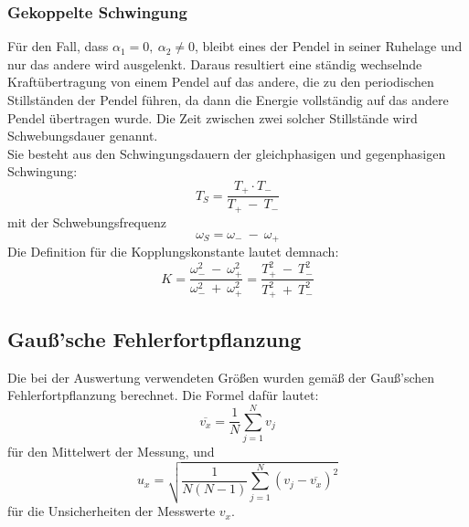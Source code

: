 \subsubsection{Gekoppelte Schwingung}
Für den Fall, dass $\alpha_1 = 0,\ \alpha_2 \neq 0$, bleibt eines der Pendel in seiner Ruhelage und nur das andere wird ausgelenkt.
Daraus resultiert eine ständig wechselnde Kraftübertragung von einem Pendel auf das andere, die zu den periodischen Stillständen der Pendel führen, da dann die Energie vollständig auf das andere Pendel übertragen wurde.
Die Zeit zwischen zwei solcher Stillstände wird Schwebungsdauer genannt.\\
Sie besteht aus den Schwingungsdauern der gleichphasigen und gegenphasigen Schwingung:
\begin{equation}
    T_S = \frac{T_+\cdot T_-}{T_+\ -\ T_-}
    \label{eq:Tpose}
\end{equation}
mit der Schwebungsfrequenz
\begin{equation}
    \omega_S = \omega_-\ -\ \omega_+
    \label{eq:lol3}
\end{equation}
Die Definition für die Kopplungskonstante lautet demnach:
\begin{equation}
    K = \frac{\omega_-^2\ -\ \omega_+^2}{\omega_-^2\ +\ \omega_+^2} = \frac{T_+^2\ -\ T_-^2}{T_+^2\ +\ T_-^2}
    \label{eq:Kform}
\end{equation}

\subsection{Gauß'sche Fehlerfortpflanzung}
\label{sec:gauß}
Die bei der Auswertung verwendeten Größen wurden gemäß der Gauß'schen Fehlerfortpflanzung berechnet.
Die Formel dafür lautet:
\begin{equation}
    \overline{v_x}=\frac{1}{N} \sum_{j=1}^N v_j
\end{equation}
für den Mittelwert der Messung, und
\begin{equation}
    u_x = \sqrt{\frac{1}{N(N-1)} \sum_{j=1}^N (v_j-\overline{v_x})^2}
\end{equation}
für die Unsicherheiten der Messwerte $v_x$.